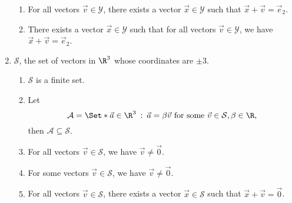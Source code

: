 \begin{exercises}
\begin{problist}
\begin{enumerate}
\begin{enumerate}
					\item For all vectors $\vec v \in \mathcal{Y}$, there exists a vector
						$\vec x \in \mathcal{Y}$ such that $\vec x + \vec v = \vec e_{2}$.

					\item There exists a vector $\vec x \in \mathcal{Y}$ such that for
						all vectors $\vec v \in \mathcal{Y}$, we have $\vec x + \vec v =
						\vec e_{2}$.
				\end{enumerate}

			\item $\mathcal{S}$, the set of vectors in $\R^{3}$ whose coordinates are $\pm3$.
				\begin{enumerate}
					\item $\mathcal{S}$ is a finite set.

					\item Let
					\[
						\mathcal{A} = \Set*{\vec a \in \R^3 \given \vec a = \beta \vec v
									  \text{ for some } \vec v \in \mathcal{S}, \beta \in \R },
					\]
					then $\mathcal{A} \subseteq \mathcal{S}$.

					\item For all vectors $\vec v \in \mathcal{S}$, we have $\vec v \neq
						\vec 0$.

					\item For some vectors $\vec v \in \mathcal{S}$, we have $\vec v
						\neq \vec 0$.

					\item For all vectors $\vec v \in \mathcal{S}$, there exists a vector
						$\vec x \in \mathcal{S}$ such that $\vec x + \vec v = \vec 0$.


\end{enumerate}
\end{enumerate}
\end{problist}
\end{exercises}
